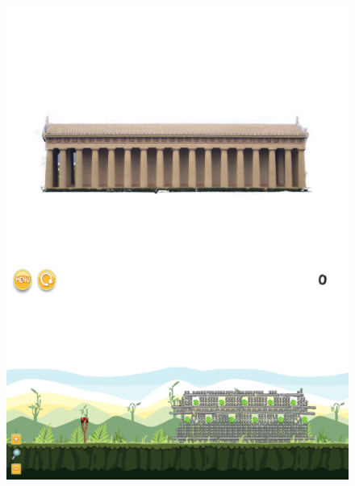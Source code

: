 \documentclass{dalthesis}
\begin{document}
\begin{figure}
  \includegraphics[width=\textwidth,height=\textheight,keepaspectratio]{levels/pictures/buildings/parthenon.jpg}
  \includegraphics[width=\textwidth,height=\textheight,keepaspectratio]{levels/screenshots/buildings/parthenon.png}
\end{figure}
\end{document}
